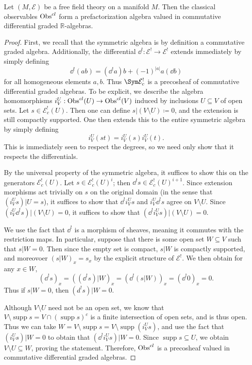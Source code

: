 \begin{lemma}\label{lma:4.3.10}
	Let $(M,\mathcal{E} )$ be a free field theory on a manifold $M$. Then the classical observables $\operatorname{Obs}^{cl} $ form a prefactorization algebra valued in commutative differential graded $\mathbb{R} $-algebras.
\end{lemma}
\begin{proof}
	First, we recall that the symmetric algebra is by definition a commutative graded algebra. Additionally, the differential $\dd ^! : \mathcal{E} ^! \to \mathcal{E} ^!$ extends immediately by simply defining
	\[
		\dd^!(ab) = (\dd^!a)b + (-1)^{\left| a \right| } a(\dd b)
	\]
	for all homogeneous elements $a,b$. Thus $\Sym \mathcal{E} ^!_c$ is a precosheaf of commutative differential graded algebras. To be explicit, we describe the algebra homomorphisms $i^U_V : \operatorname{Obs}^{cl} (U) \to \operatorname{Obs}^{cl} (V)$ induced by inclusions $U\subseteq V$ of open sets. Let $s\in \mathcal{E} _c^!(U)$. Then one can define $s|(V\setminus U) \coloneqq 0$, and the extension is still compactly supported. One then extends this to the entire symmetric algebra by simply defining
	\[
		i^U_V(st) = i^U_V(s)i^U_V(t)
	.\]
	This is immediately seen to respect the degrees, so we need only show that it respects the differentials.

By the universal property of the symmetric algebra, it suffices to show this on the generators $\mathcal{E} _c^!(U)$. Let $s\in \mathcal{E} _c^!(U)^i$; then $\dd ^! s\in \mathcal{E} _c^!(U)^{i+1} $. Since extension morphisms act trivially on $s$ on the original domain (in the sense that $(i^U_Vs)|U=s$), it suffices to show that $\dd ^!i^U_Vs$ and $i^U_V\dd ^!s$ agree on $V\setminus U$. Since $(i^U_V\dd ^!s)|(V\setminus U)=0$, it suffices to show that $(\dd ^!i^U_Vs)|(V\setminus U)=0$.

We use the fact that $\dd ^!$ is a morphism of sheaves, meaning it commutes with the restriction maps. In particular, suppose that there is some open set $W\subseteq V$ such that $s|W=0$. Then since the empty set is compact, $s|W$ is compactly supported, and moreovoer $(s|W)_x=s_x$ by the explicit structure of $\mathcal{E} ^!$. We then obtain for any $x\in W$,
	\[
		(\dd ^!s)_x = ((\dd ^!s)|W)_x = (\dd ^!(s|W))_x = (\dd ^!0)_x=0
	.\]
	Thus if $s|W=0$, then $(d^!s)|W=0$.

	Although $V\setminus U$ need not be an open set, we know that $V\setminus \operatorname{supp} s = V \cap  (\operatorname{supp} s) ^{c} $ is a finite intersection of open sets, and is thus open. Thus we can take $W = V\setminus \operatorname{supp} s = V\setminus \operatorname{supp} (i^U_Vs)$, and use the fact that $(i^U_Vs)|W=0$ to obtain that $(\dd ^!i^U_Vs)|W=0$. Since $\operatorname{supp} s \subseteq U$, we obtain $V\setminus U \subseteq W$, proving the statement. Therefore, $\operatorname{Obs}^{cl} $ is a precosheaf valued in commutative differential graded algebras.


\end{proof}

